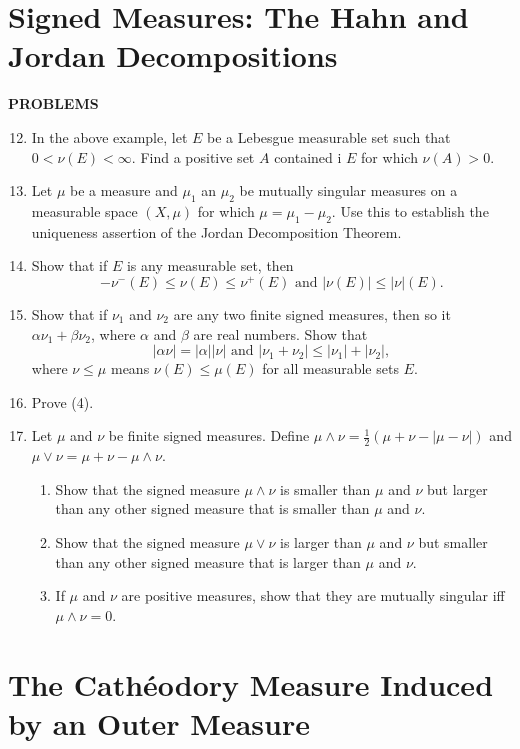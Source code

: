 \section{Signed Measures: The Hahn and Jordan Decompositions}
\begin{center}
	\textbf{PROBLEMS}
\end{center}
\begin{enumerate}
	\setcounter{enumi}{11}
	\item In the above example, let $E$ be a Lebesgue measurable set such that $0<\nu(E)<\infty$.
	Find a positive set $A$ contained i $E$ for which $\nu(A)>0$.
	\item Let $\mu$ be a measure and $\mu_1$ an $\mu_2$ be mutually singular measures on a measurable space $(X,\mu)$ for which $\mu=\mu_1-\mu_2$.
	Use this to establish the uniqueness assertion of the Jordan Decomposition Theorem.
	\item Show that if $E$ is any measurable set, then
	\[
		-\nu^-(E)\le\nu(E)\le\nu^+(E)\text{ and }|\nu(E)|\le|\nu|(E).	
	\]
	\item Show that if $\nu_1$ and $\nu_2$ are any two finite signed measures, then so it $\alpha\nu_1+\beta\nu_2$, where $\alpha$ and $\beta$ are real numbers. Show that
	\[
		|\alpha\nu|=|\alpha||\nu|\text{ and }|\nu_1+\nu_2|\le|\nu_1|+|\nu_2|,
	\]
	where $\nu\le\mu$ means $\nu(E)\le\mu(E)$ for all measurable sets $E$.
	\item Prove (4).
	\item Let $\mu$ and $\nu$ be finite signed measures.
	Define $\mu\land\nu=\frac{1}{2}(\mu+\nu-|\mu-\nu|)$ and $\mu\lor\nu=\mu+\nu-\mu\land\nu$.
	\begin{enumerate}[label=(\roman*),align=left]  
		\item Show that the signed measure $\mu\land\nu$ is smaller than $\mu$ and $\nu$ but larger than any other signed measure that is smaller than $\mu$ and $\nu$.
		\item Show that the signed measure $\mu\lor\nu$ is larger than $\mu$ and $\nu$ but smaller than any other signed measure that is larger than $\mu$ and $\nu$.
		\item If $\mu$ and $\nu$ are positive measures, show that they are mutually singular iff $\mu\land\nu=0$.
	\end{enumerate}
\end{enumerate}

\section{The Cath\'eodory Measure Induced by an Outer Measure}

